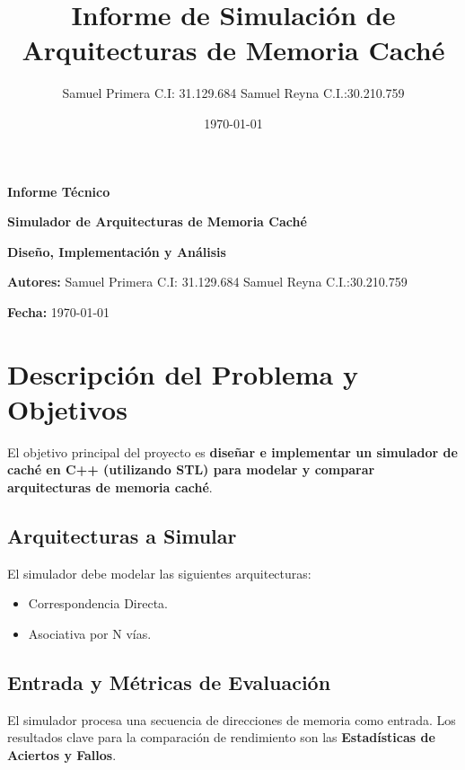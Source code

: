 \documentclass{article}
\title{\textbf{Informe de Simulación de Arquitecturas de Memoria Caché}}
\author{Samuel Primera    C.I: 31.129.684
Samuel Reyna       C.I.:30.210.759}
\date{\today}
\begin{document}
\begin{titlepage}
    \centering
    \vspace*{1in}
    {\Huge \textbf{Informe Técnico} \par}
    \vspace{0.5in}
    {\Huge \textbf{Simulador de Arquitecturas de Memoria Caché} \par}
    \vspace{1.5in}
    {\Large \textbf{Diseño, Implementación y Análisis} \par}
    \vspace{1in}
    {\Large \textbf{Autores:} Samuel Primera    C.I: 31.129.684
Samuel Reyna       C.I.:30.210.759 \par}
    \vspace{0.5in}
    {\Large \textbf{Fecha:} \today \par}
\end{titlepage}

\maketitle
\thispagestyle{empty}
\clearpage


\setcounter{page}{1}

\section{Descripción del Problema y Objetivos}
El objetivo principal del proyecto es \textbf{diseñar e implementar un simulador de caché en C++ (utilizando STL) para modelar y comparar arquitecturas de memoria caché}.

\subsection{Arquitecturas a Simular}
El simulador debe modelar las siguientes arquitecturas:
\begin{itemize}
    \item Correspondencia Directa.
    \item Asociativa por N vías.
\end{itemize}

\subsection{Entrada y Métricas de Evaluación}
El simulador procesa una secuencia de direcciones de memoria como entrada. Los resultados clave para la comparación de rendimiento son las \textbf{Estadísticas de Aciertos y Fallos}.
\end{document}
